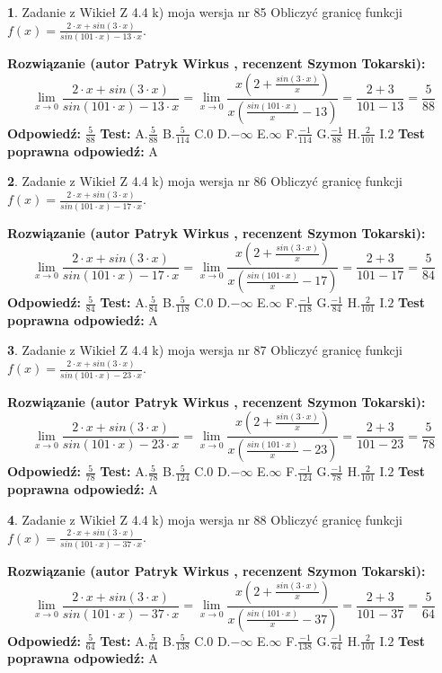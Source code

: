 \documentclass[12pt, a4paper]{article}
\theoremstyle{definition} %
\newtheorem{zad}{}
\newcommand{\zadStart}[1]{\begin{zad}#1\newline}
\newcommand{\zadStop}{\end{zad}}
\newcommand{\rozwStart}[2]{\noindent \textbf{Rozwiązanie (autor #1 , recenzent #2): }\newline}
\newcommand{\rozwStop}{\newline}
\newcommand{\odpStart}{\noindent \textbf{Odpowiedź:}\newline}
\newcommand{\odpStop}{\newline}
\newcommand{\testStart}{\noindent \textbf{Test:}\newline}
\newcommand{\testStop}{\newline}
\newcommand{\kluczStart}{\noindent \textbf{Test poprawna odpowiedź:}\newline}
\newcommand{\kluczStop}{\newline}
\begin{document}
\zadStart{Zadanie z Wikieł Z 4.4 k) moja wersja nr 85}
Obliczyć granicę funkcji $f(x)=\frac{2\cdot x +sin(3\cdot x)}{sin(101\cdot x) -13\cdot x}$.
\zadStop
\rozwStart{Patryk Wirkus}{Szymon Tokarski}
$$\lim\limits_{x\to 0}\frac{2\cdot x +sin(3\cdot x)}{sin(101\cdot x) -13\cdot x}
=\lim\limits_{x\to 0}\frac{x(2+\frac{sin(3\cdot x)}{x})}{x(\frac{sin(101\cdot x)}{x}-13)}
=\frac{2+3}{101-13} = \frac{5}{88}$$
\rozwStop
\odpStart
$\frac{5}{88}$
\odpStop
\testStart
A.$\frac{5}{88}$
B.$\frac{5}{114}$
C.$0$
D.$-\infty$
E.$\infty$
F.$\frac{-1}{114}$
G.$\frac{-1}{88}$
H.$\frac{2}{101}$
I.$2$
\testStop
\kluczStart
A
\kluczStop



\zadStart{Zadanie z Wikieł Z 4.4 k) moja wersja nr 86}
Obliczyć granicę funkcji $f(x)=\frac{2\cdot x +sin(3\cdot x)}{sin(101\cdot x) -17\cdot x}$.
\zadStop
\rozwStart{Patryk Wirkus}{Szymon Tokarski}
$$\lim\limits_{x\to 0}\frac{2\cdot x +sin(3\cdot x)}{sin(101\cdot x) -17\cdot x}
=\lim\limits_{x\to 0}\frac{x(2+\frac{sin(3\cdot x)}{x})}{x(\frac{sin(101\cdot x)}{x}-17)}
=\frac{2+3}{101-17} = \frac{5}{84}$$
\rozwStop
\odpStart
$\frac{5}{84}$
\odpStop
\testStart
A.$\frac{5}{84}$
B.$\frac{5}{118}$
C.$0$
D.$-\infty$
E.$\infty$
F.$\frac{-1}{118}$
G.$\frac{-1}{84}$
H.$\frac{2}{101}$
I.$2$
\testStop
\kluczStart
A
\kluczStop



\zadStart{Zadanie z Wikieł Z 4.4 k) moja wersja nr 87}
Obliczyć granicę funkcji $f(x)=\frac{2\cdot x +sin(3\cdot x)}{sin(101\cdot x) -23\cdot x}$.
\zadStop
\rozwStart{Patryk Wirkus}{Szymon Tokarski}
$$\lim\limits_{x\to 0}\frac{2\cdot x +sin(3\cdot x)}{sin(101\cdot x) -23\cdot x}
=\lim\limits_{x\to 0}\frac{x(2+\frac{sin(3\cdot x)}{x})}{x(\frac{sin(101\cdot x)}{x}-23)}
=\frac{2+3}{101-23} = \frac{5}{78}$$
\rozwStop
\odpStart
$\frac{5}{78}$
\odpStop
\testStart
A.$\frac{5}{78}$
B.$\frac{5}{124}$
C.$0$
D.$-\infty$
E.$\infty$
F.$\frac{-1}{124}$
G.$\frac{-1}{78}$
H.$\frac{2}{101}$
I.$2$
\testStop
\kluczStart
A
\kluczStop



\zadStart{Zadanie z Wikieł Z 4.4 k) moja wersja nr 88}
Obliczyć granicę funkcji $f(x)=\frac{2\cdot x +sin(3\cdot x)}{sin(101\cdot x) -37\cdot x}$.
\zadStop
\rozwStart{Patryk Wirkus}{Szymon Tokarski}
$$\lim\limits_{x\to 0}\frac{2\cdot x +sin(3\cdot x)}{sin(101\cdot x) -37\cdot x}
=\lim\limits_{x\to 0}\frac{x(2+\frac{sin(3\cdot x)}{x})}{x(\frac{sin(101\cdot x)}{x}-37)}
=\frac{2+3}{101-37} = \frac{5}{64}$$
\rozwStop
\odpStart
$\frac{5}{64}$
\odpStop
\testStart
A.$\frac{5}{64}$
B.$\frac{5}{138}$
C.$0$
D.$-\infty$
E.$\infty$
F.$\frac{-1}{138}$
G.$\frac{-1}{64}$
H.$\frac{2}{101}$
I.$2$
\testStop
\kluczStart
A
\kluczStop
\end{document}
